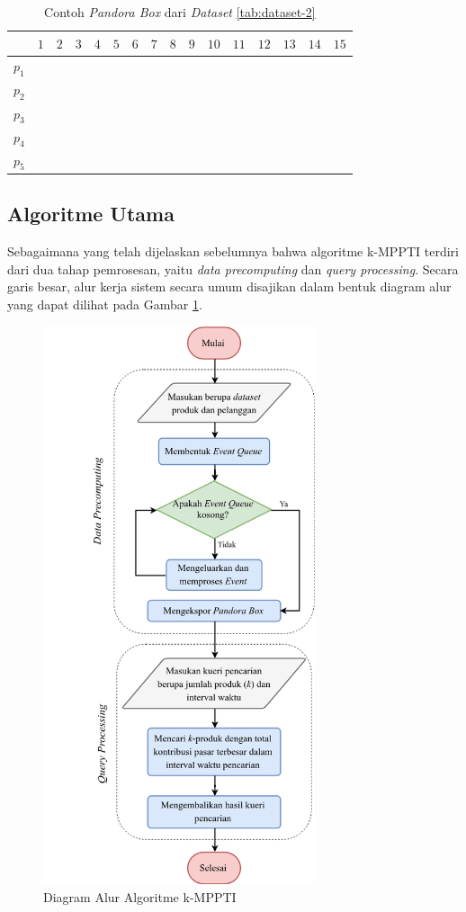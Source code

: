 \begin{table}[H]
	\small
	\centering
	\begin{tabular}{|C|C|C|C|C|C|C|C|C|C|C|C|C|C|C|C|}
		\hline
		& $1$ & $2$ & $3$ & $4$ & $5$ & $6$ & $7$ & $8$ & $9$ & $10$ & $11$ & $12$ & $13$ & $14$ & $15$ \\ \hline \hline
		$p_1$ & & & & & & & & & & & & & & & \\ \hline
		$p_2$ & & & & & & & & & & & & & & & \\ \hline
		$p_3$ & & & & & & & & & & & & & & & \\ \hline
		$p_4$ & & & & & & & & & & & & & & & \\ \hline
		$p_5$ & & & & & & & & & & & & & & & \\ \hline
	\end{tabular} 
	\caption{Contoh \textit{Pandora Box} dari \textit{Dataset} \ref{tab:dataset-2}}
	\label{tab:pbox}
\end{table}

\subsection{Algoritme Utama}
\tab Sebagaimana yang telah dijelaskan sebelumnya bahwa algoritme k-MPPTI terdiri dari dua tahap pemrosesan, yaitu \textit{data precomputing} dan \textit{query processing}. Secara garis besar, alur kerja sistem secara umum disajikan dalam bentuk diagram alur yang dapat dilihat pada Gambar \ref{fig:diagram-alur1}.

\begin{figure}[H]
	\centering
	\includegraphics[width=8cm]{bab3/img/flowchart.png}
	\caption{Diagram Alur Algoritme k-MPPTI}
	\label{fig:diagram-alur1}
\end{figure}

